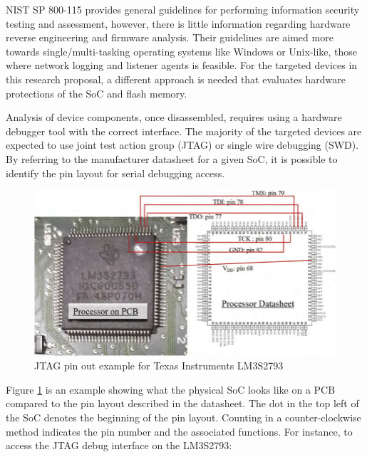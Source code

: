 NIST SP 800-115 \autocite{NISTSP8001152020} provides general guidelines for performing information security testing and assessment, however, there is little information regarding hardware reverse engineering and firmware analysis. Their guidelines are aimed more towards single/multi-tasking operating systems like Windows or Unix-like, those where network logging and listener agents is feasible. For the targeted devices in this research proposal, a different approach is needed that evaluates hardware protections of the SoC and flash memory. 

Analysis of device components, once disassembled, requires using a hardware debugger tool with the correct interface. The majority of the targeted devices are expected to use joint test action group (JTAG) or single wire debugging (SWD). By referring to the manufacturer datasheet for a given SoC, it is possible to identify the pin layout for serial debugging access.

\begin{figure}[ht]%
  \centering
  \includegraphics[keepaspectratio]{Figures/JTAGExample.png}
  \caption{JTAG pin out example for Texas Instruments LM3S2793}%
  \label{fig:jtag_pinout}%
\end{figure}

Figure \ref{fig:jtag_pinout} is an example showing what the physical SoC looks like on a PCB compared to the pin layout described in the datasheet. The dot in the top left of the SoC denotes the beginning of the pin layout. Counting in a counter-clockwise method indicates the pin number and the associated functions. For instance, to access the JTAG debug interface on the LM3S2793:

